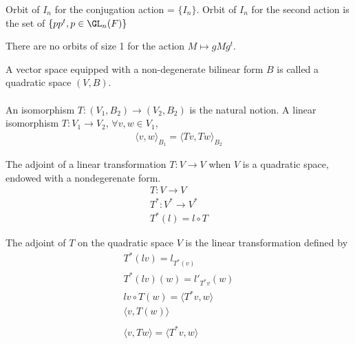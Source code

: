 \documentclass[class=scrartcl, crop=false]{standalone}
\begin{document}
\begin{example}
  \begin{enumerate}
    \ii[]
    \ii
    Orbit of $I_n$ for the conjugation action = $\{I_n\}$.
    \ii
    Orbit of $I_n$ for the second action is the set of $\{pp^t, p \in \GL_n(F)\}$
  \end{enumerate} 
\end{example} 

\begin{exercise}
  There are no orbits of size 1 for the action $M \mapsto gMg^t$.
\end{exercise} 

\begin{definition}
  A vector space equipped with a non-degenerate bilinear form $B$ is called a quadratic space $(V, B)$. \\\\
  An isomorphism $T: (V_1, B_2) \to (V_2, B_2)$ is the natural notion. A linear isomorphism $T: V_1 \to V_2$, $\forall v, w \in V_1$,
  \begin{gather*}
    \langle v, w \rangle_{B_1} = \langle Tv, Tw \rangle_{B_2}
  \end{gather*} 
\end{definition} 

The adjoint of a linear transformation $T: V \to V$ when $V$ is a quadratic space, endowed with a nondegerenate form.
\begin{gather*}
  T: V \to V \\
  T^*: V^* \to V^* \\
  T^*(l) = l \circ T
\end{gather*} 

The adjoint of $T$ on the quadratic space $V$ is the linear transformation defined by
\begin{gather*}
  T^*(lv) = l_{T^*(v)} \\
  T^*(lv)(w) = l'_{T^*v}(w) \\
  lv \circ T(w) = \langle T^*v, w \rangle \\
  \langle v, T(w) \rangle \\\\
  \langle v, Tw \rangle = \langle T^*v, w \rangle
\end{gather*} 
\end{document}
